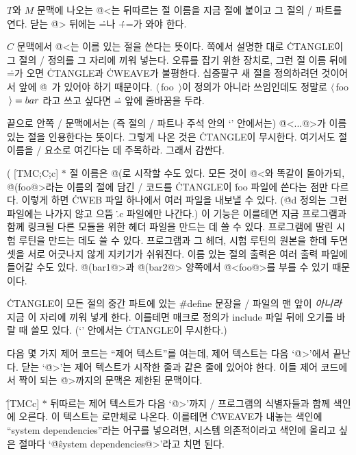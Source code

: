 \more $T$와 $M$ 문맥에 나오는 \.{@<}는 뒤따르는 절 이름을 지금 절에 붙이고 그
절의 \CEE/ 파트를 연다. 닫는 \.{@>} 뒤에는 \.{=}나 \.{+=}가 와야 한다.

\more $C$ 문맥에서 \.{@<}는 이름 있는 절을 쓴다는 뜻이다. \tangref 쪽에서 설명한
대로 \.{CTANGLE}이 그 절의 \CEE/ 정의를 그 자리에 끼워 넣는다. 오류를 잡기 위한
장치로, 그런 절 이름 뒤에 \.=가 오면 \.{CTANGLE}과 \.{CWEAVE}가 불평한다. 십중팔구
새 절을 정의하려던 것이어서 앞에 \.{@\ }가 있어야 하기 때문이다. $\langle\,$foo
$\,\rangle$이 정의가 아니라 쓰임인데도 정말로 $\langle\,$foo$\,\rangle=\\{bar}$
라고 쓰고 싶다면 \.= 앞에 줄바꿈을 두라.

\more 끝으로 안쪽 \CEE/ 문맥에서는 (즉 절의 \TEX/ 파트나 주석 안의 `\pb' 안에서는)
\.{@<...@>}가 이름 있는 절을 인용한다는 뜻이다. 그렇게 나온 것은 \.{CTANGLE}이
무시한다. 여기서도 절 이름을 \CEE/ 요소로 여긴다는 데 주목하라. 그래서 
감싼다.

\@( [TM\to C;\;C;\;c] $*$ 절 이름은 \.{@(}로 시작할 수도 있다. 모든 것이
\.{@<}와 똑같이 돌아가되, \.{@(foo@>}라는 이름의 절에 담긴 \CEE/ 코드를
\.{CTANGLE}이 \.{foo} 파일에 쓴다는 점만 다르다. 이렇게 하면 \.{CWEB} 파일
하나에서 여러 파일을 내보낼 수 있다. (\.{@d} 정의는 그런 파일에는 나가지 않고
으뜸 \.{.c} 파일에만 나간다.) 이 기능은 이를테면 지금 프로그램과 함께 링크될 다른
모듈을 위한 헤더 파일을 만드는 데 쓸 수 있다. 프로그램에 딸린 시험 루틴을 만드는
데도 쓸 수 있다. 프로그램과 그 헤더, 시험 루틴의 원본을 한데 두면 셋을 서로 어긋나지
않게 지키기가 쉬워진다. 이름 있는 절의 출력은 여러 출력 파일에 들어갈 수도 있다.
\.{@(bar1@>}과 \.{@(bar2@>} 양쪽에서 \.{@<foo@>}를 부를 수 있기 때문이다.

\@h [Cc] \.{CTANGLE}이 모든 절의 중간 파트에 있는 \.{\#define} 문장을 \CEE/
파일의 맨 앞이 {\it 아니라\/} 지금 이 자리에 끼워 넣게 한다. 이를테면 매크로
정의가 include 파일 뒤에 오기를 바랄 때 쓸모 있다. (`\pb' 안에서는 \.{CTANGLE}이
무시한다.)

\subsec
다음 몇 가지 제어 코드는 ``제어 텍스트''를 여는데, 제어 텍스트는 다음
`\.{@>}'에서 끝난다. 닫는 `\.{@>}'는 제어 텍스트가 시작한 줄과 같은 줄에 있어야
한다. 이들 제어 코드에서 짝이 되는 \.{@>}까지의 문맥은 제한된 문맥이다.

\@\^ [TMCc] $*$ 뒤따르는 제어 텍스트가 다음 `\.{@>}'까지 \CEE/ 프로그램의
식별자들과 함께 색인에 오른다. 이 텍스트는 로만체로 나온다. 이를테면 \.{CWEAVE}가
내놓는 색인에 ``system dependencies''라는 어구를 넣으려면, 시스템 의존적이라고
색인에 올리고 싶은 절마다 `\.{@\^system dependencies@>}'라고 치면 된다.

